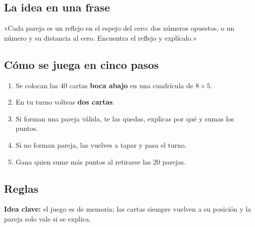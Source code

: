 \documentclass[12pt, letterpaper]{article}
\begin{document}
\subsection{La idea en una frase}

\begin{cuadroextra}
  «Cada pareja es un reflejo en el espejo del cero: dos números opuestos, o un número y su distancia al cero. Encuentra el reflejo y explícalo.»
\end{cuadroextra}

\subsection{Cómo se juega en cinco pasos}

\begin{enumerate}[leftmargin=*]
  \item Se colocan las 40 cartas \textbf{boca abajo} en una cuadrícula de $8\times 5$.
  \item En tu turno volteas \textbf{dos cartas}.
  \item Si forman una pareja válida, te las quedas, explicas por qué y sumas los puntos.
  \item Si no forman pareja, las vuelves a tapar y pasa el turno.
  \item Gana quien sume más puntos al retirarse las 20 parejas.
\end{enumerate}

\subsection{Reglas}

\textbf{Idea clave:} el juego es de memoria; las cartas siempre vuelven a su posición y la pareja solo vale si se explica.
\end{document}
